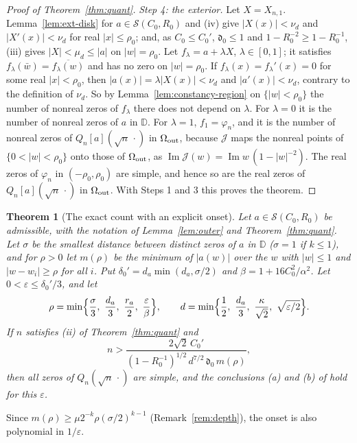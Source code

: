 \documentclass[11pt]{amsart}
\newtheorem{theorem}{Theorem}[section]
\theoremstyle{definition}
\theoremstyle{remark}
\numberwithin{equation}{section}
\newcommand{\D}{\mathbb{D}}
\newcommand{\eps}{\varepsilon}
\DeclareMathOperator{\im}{Im}
\begin{document}
\begin{proof}[Proof of Theorem~\ref{thm:quant}]
\emph{Step 4: the exterior.} Let $X=X_{n,1}$. Lemma~\ref{lem:ext-disk} for $a\in\mathcal S(C_0,R_0)$ and (iv) give $|X(x)|<\nu_d$ and $|X'(x)|<\nu_d$ for real $|x|\le\rho_0$; and, as $C_0\le C_0'$, $\mathfrak d_0\le1$ and $1-R_0^{-2}\ge1-R_0^{-1}$, (iii) gives $|X|<\mu_d\le|a|$ on $|w|=\rho_0$. Let $f_\lambda=a+\lambda X$, $\lambda\in[0,1]$; it satisfies $f_\lambda(\bar w)=\overline{f_\lambda(w)}$ and has no zero on $|w|=\rho_0$. If $f_\lambda(x)=f_\lambda'(x)=0$ for some real $|x|<\rho_0$, then $|a(x)|=\lambda|X(x)|<\nu_d$ and $|a'(x)|<\nu_d$, contrary to the definition of $\nu_d$. So by Lemma~\ref{lem:constancy-region} on $\{|w|<\rho_0\}$ the number of nonreal zeros of $f_\lambda$ there does not depend on $\lambda$. For $\lambda=0$ it is the number of nonreal zeros of $a$ in $\D$. For $\lambda=1$, $f_1=\varphi_n$, and it is the number of nonreal zeros of $Q_n[a](\sqrt n\,\cdot)$ in $\Omega_{\rm out}$, because $\mathcal J$ maps the nonreal points of $\{0<|w|<\rho_0\}$ onto those of $\Omega_{\rm out}$, as $\im\mathcal J(w)=\im w\,(1-|w|^{-2})$. The real zeros of $\varphi_n$ in $(-\rho_0,\rho_0)$ are simple, and hence so are the real zeros of $Q_n[a](\sqrt n\,\cdot)$ in $\Omega_{\rm out}$. With Steps 1 and 3 this proves the theorem.
\end{proof}

\begin{theorem}[{The exact count with an explicit onset}]\label{thm:quant-main}
Let $a\in\mathcal S(C_0,R_0)$ be admissible, with the notation of Lemma~\ref{lem:outer} and Theorem~\ref{thm:quant}. Let $\sigma$ be the smallest distance between distinct zeros of $a$ in $\D$ ($\sigma=1$ if $k\le1$), and for $\rho>0$ let $m(\rho)$ be the minimum of $|a(w)|$ over the $w$ with $|w|\le1$ and $|w-w_i|\ge\rho$ for all $i$. Put $\delta_0'=d_a\min(d_a,\sigma/2)$ and $\beta=1+16C_0^2/\alpha^2$. Let $0<\eps\le\delta_0'/3$, and let
\[
\rho=\min\Bigl\{\frac\sigma3,\ \frac{d_a}3,\ \frac{r_a}2,\ \frac\eps\beta\Bigr\},\qquad d=\min\Bigl\{\frac12,\ \frac{d_a}3,\ \frac\kappa{\sqrt2},\ \sqrt{\eps/2}\Bigr\}.
\]
If $n$ satisfies (ii) of Theorem~\ref{thm:quant} and
\[
n>\frac{2\sqrt2\,C_0'}{(1-R_0^{-1})^{1/2}\,d^{7/2}\,\mathfrak d_0\,m(\rho)},
\]
then all zeros of $Q_n(\sqrt n\,\cdot)$ are simple, and the conclusions (a) and (b) of \cite[Theorem~\ref{M-thm:main}]{Main} hold for this $\eps$.
\end{theorem}

Since $m(\rho)\ge\mu2^{-k}\rho(\sigma/2)^{k-1}$ (Remark~\ref{rem:depth}), the onset is also polynomial in $1/\eps$.
\end{document}
